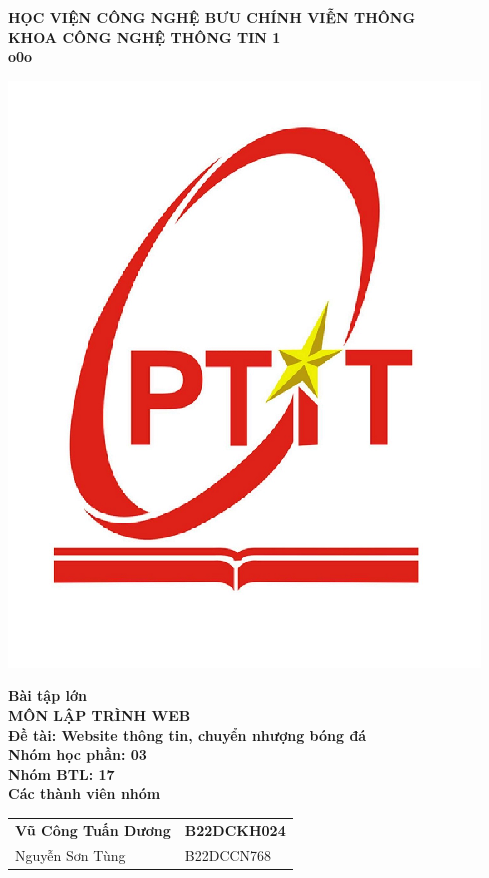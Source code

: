 \documentclass[BTL.tex]{subfiles}
\begin{document}
\begin{titlepage}
\thispagestyle{empty}
\begin{center}

{\textbf{\large{HỌC VIỆN CÔNG NGHỆ BƯU CHÍNH VIỄN THÔNG}}}\\
{\textbf{\large{KHOA CÔNG NGHỆ THÔNG TIN 1}}}\\
{\textbf{\large{\underline{\hspace{3cm}} o0o \underline{\hspace{3cm}}}}}\\
\begin{center}
\includegraphics[width=0.35\linewidth]{Hinhve/ptit_logo_1.png}
\end{center}


{\textbf{\LARGE{ Bài tập lớn}}}\\[0.5cm]
{\textbf{\LARGE{ MÔN LẬP TRÌNH WEB}}}\\[0.5cm]
{\textbf{\Large{Đề tài: Website thông tin, chuyển nhượng bóng đá}}}\\[0.5cm]
{\textbf{\normalsize{Nhóm học phần: 03}}}\\
{\textbf{\normalsize{Nhóm BTL: 17}}}\\
{\textbf{\normalsize{Các thành viên nhóm}}}\\
\vspace{0.5cm}

\begin{tabular}{ll}

{\textbf{\large{Vũ Công Tuấn Dương}}}   & {\textbf{\large{B22DCKH024}}}\\
{{\large{Nguyễn Sơn Tùng}}}  & {{\large{B22DCCN768}}} \\
\end{tabular}

\vspace{4cm}
\begin{table}[H]
\centering


\end{table}
\end{center}
\end{titlepage}
\end{document}

